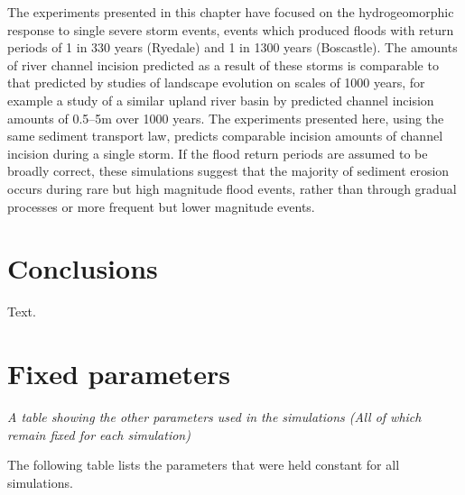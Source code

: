 The experiments presented in this chapter have focused on the hydrogeomorphic response to single severe storm events, events which produced floods with return periods of 1 in 330 years (Ryedale) and 1 in 1300 years (Boscastle). The amounts of river channel incision predicted as a result of these storms is comparable to that predicted by studies of landscape evolution on scales of 1000 years, for example a study of a similar upland river basin by \citep{coulthard2016sensitivity} predicted channel incision amounts of 0.5--5m over 1000 years. The experiments presented here, using the same sediment transport law, predicts comparable incision amounts of channel incision during a single storm. If the flood return periods are assumed to be broadly correct, these simulations suggest that the majority of sediment erosion occurs during rare but high magnitude flood events, rather than through gradual processes or more frequent but lower magnitude events.

\section{Conclusions}  %
Text.



\section{Fixed parameters}

\textit{A table showing the other parameters used in the simulations (All of which remain fixed for each simulation)}

The following table lists the parameters that were held constant for all simulations.
